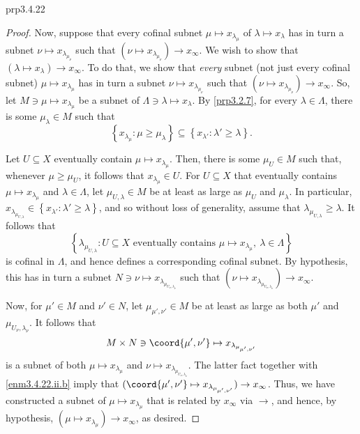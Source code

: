 \begin{prp}{}{prp3.4.22}
\begin{proof}
Now, suppose that every cofinal subnet $\mu \mapsto x_{\lambda _{\mu}}$ of $\lambda \mapsto x_{\lambda}$ has in turn a subnet $\nu \mapsto x_{\lambda _{\mu _{\nu}}}$ such that $(\nu \mapsto x_{\lambda _{\mu _{\nu}}})\to x_{\infty}$.  We wish to show that $(\lambda \mapsto x_{\lambda})\to x_{\infty}$.  To do that, we show that \emph{every} subnet (not just every cofinal subnet) $\mu \mapsto x_{\lambda _{\mu}}$ has in turn a subnet $\nu \mapsto x_{\lambda _{\mu _{\nu}}}$ such that $(\nu \mapsto x_{\lambda _{\mu _{\nu}}})\to x_{\infty}$.  So, let $M\ni \mu \mapsto x_{\lambda _{\mu}}$ be a subnet of $\Lambda \ni \lambda \mapsto x_{\lambda}$.  By \cref{prp3.2.7}, for every $\lambda \in \Lambda$, there is some $\mu _{\lambda}\in M$ such that
\begin{equation}
\left\{ x_{\lambda _{\mu}}:\mu \geq \mu _{\lambda}\right\} \subseteq \left\{ x_{\lambda '}:\lambda '\geq \lambda \right\} .
\end{equation}

Let $U\subseteq X$ eventually contain $\mu \mapsto x_{\lambda _{\mu}}$.  Then, there is some $\mu _U\in M$ such that, whenever $\mu \geq \mu _U$, it follows that $x_{\lambda _{\mu}}\in U$.  For $U\subseteq X$ that eventually contains $\mu \mapsto x_{\lambda _{\mu}}$ and $\lambda \in \Lambda$, let $\mu _{U,\lambda}\in M$ be at least as large as $\mu _U$ and $\mu _{\lambda}$.  In particular, $x_{\lambda _{\mu _{U,\lambda}}}\in \left\{ x_{\lambda '}:\lambda '\geq \lambda \right\}$, and so without loss of generality, assume that $\lambda _{\mu _{U,\lambda}}\geq \lambda$.  It follows that
\begin{equation}
\left\{ \lambda _{\mu _{U,\lambda}}:U\subseteq X\text{ eventually contains }\mu \mapsto x_{\lambda _{\mu}},\ \lambda \in \Lambda \right\}
\end{equation}
is cofinal in $\Lambda$, and hence defines a corresponding cofinal subnet.  By hypothesis, this has in turn a subnet $N\ni \nu \mapsto x_{\lambda _{\mu _{U_{\nu},\lambda _{\nu}}}}$ such that $(\nu \mapsto x_{\lambda _{\mu _{U_{\nu},\lambda _{\nu}}}})\to x_{\infty}$.

Now, for $\mu '\in M$ and $\nu '\in N$, let $\mu _{\mu ',\nu '}\in M$ be at least as large as both $\mu '$ and $\mu _{U_{\nu},\lambda _{\nu}}$.  It follows that
\begin{equation}
M\times N\ni \coord{\mu ',\nu '}\mapsto x_{\lambda _{\mu _{\mu ',\nu '}}}
\end{equation}
is a subnet of both $\mu \mapsto x_{\lambda _{\mu}}$ and $\nu \mapsto x_{\lambda _{\mu _{U_{\nu},\lambda _{\nu}}}}$.  The latter fact together with \cref{enm3.4.22.ii.b} imply that $(\coord{\mu ',\nu '}\mapsto x_{\lambda _{\mu _{\mu ',\nu '}}})\to x_{\infty}$.  Thus, we have constructed a subnet of $\mu \mapsto x_{\lambda _{\mu}}$ that is related by $x_{\infty}$ via $\to$, and hence, by hypothesis, $(\mu \mapsto x_{\lambda _{\mu}})\to x_{\infty}$, as desired.


\end{proof}
\end{prp}
